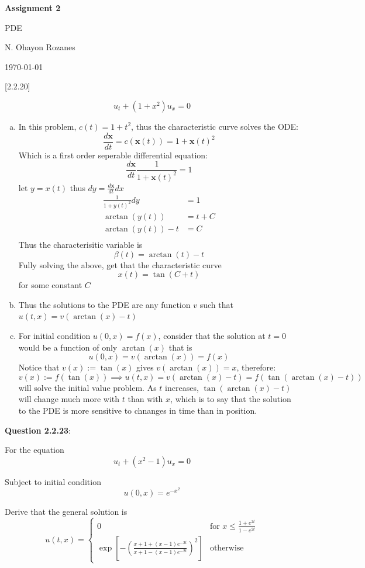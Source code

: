\documentclass{article} %
\newcommand{\question}[2][]{
  \begin{flushleft}
    \textbf{Question #1}: \textit{#2}

\end{flushleft}}
\newcommand{\maketitletwo}[2][]{
  \begin{center}
    \Large{\textbf{Assignment #1}

    PDE} %
    \vspace{5pt}

    \normalsize{N. Ohayon Rozanes  %

    \today}        %
    \vspace{15pt}

\end{center}}
\begin{document}
\maketitletwo[2]  %

\question[2.2.20]{ }

\[
  u_t + (1+x^2)u_x = 0
\]
\begin{enumerate}[(a)]
  \item In this problem, $c(t) = 1 + t^2$, thus the characteristic
    curve solves the ODE:
    $$
    \frac{d\mathbf{x}}{dt} = c(\mathbf{x}(t)) = 1 + \mathbf{x}(t)^2
    $$
    Which is a first order seperable differential equation:
    \[
      \frac{d\mathbf{x}}{dt}\frac{1}{1 + \mathbf{x}(t)^2} = 1
    \]
    let $y = x(t)$ thus $dy = \frac{d\mathbf{x}}{dt} dx$
    \begin{align*}
      \frac{1}{1 + y(t)^2} dy&= 1 \\
      \arctan(y(t)) &= t + C \\
      \arctan(y(t)) - t &= C \\
    \end{align*}
    Thus the characterisitic variable is $$\beta(t) = \arctan(t) - t$$
    Fully solving the above, get that the characteristic curve $$x(t)
    = \tan(C +t)$$ for some constant $C$
  \item  Thus the solutions to the PDE are any function $v$ such that
    $u(t,x) = v(\arctan(x) - t)$
  \item For initial condition $u(0, x) = f(x)$, consider that the
    solution at $t = 0$ would be a function of only $\arctan(x)$ that is
    \[
      u(0, x) = v(\arctan(x)) = f(x)
    \]
    Notice that $v(x) := \tan(x)$ gives $v(\arctan(x)) =
    x$, therefore:
    \[
      v(x) := f(\tan(x)) \implies u(t, x) = v(\arctan(x) - t) =
      f(\tan(\arctan(x) - t))
    \]
    will solve the initial value problem. As $t$ increases,
    $\tan(\arctan(x) - t)$ will change much more with $t$ than with
    $x$, which is to say that the solution to the PDE is more
    sensitive to chnanges in time than in position.
\end{enumerate}

\question[2.2.23]{ }

For the equation
\[
  u_t + (x^2 - 1)u_x = 0
\]

Subject to initial condition
\[
  u(0, x) = e^{-x^2}
\]

Derive that the general solution is
\[
  u(t,x) =
  \begin{cases}
    0 &\text{for } x \le \frac{1+e^{2t}}{1-e^{2t}} \\
    \exp\left[-\left(\frac{x+1 +(x-1)e^{-2t}}{x+1 -
    (x-1)e^{-2t}}\right)^2 \right] &\text{otherwise}
  \end{cases}
\]
\end{document}
